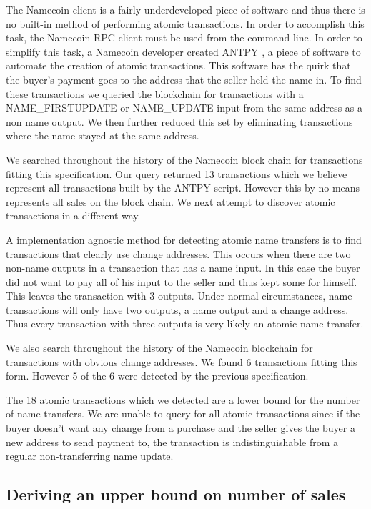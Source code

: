 The Namecoin client is a fairly underdeveloped piece of software and thus there is no built-in method of performing atomic transactions. In order to accomplish this task, the Namecoin RPC client must be used from the command line. In order to simplify this task, a Namecoin developer created ANTPY \cite{antpy}, a piece of software to automate the creation of atomic transactions. This software has the quirk that the buyer's payment goes to the address that the seller held the name in. To find these transactions we queried the blockchain for transactions with a NAME\_FIRSTUPDATE or NAME\_UPDATE input from the same address as a non name output. We then further reduced this set by eliminating transactions where the name stayed at the same address.

We searched throughout the history of the Namecoin block chain for transactions fitting this specification. Our query returned 13 transactions which we believe represent all transactions built by the ANTPY script. However this by no means represents all sales on the block chain. We next attempt to discover atomic transactions in a different way.

A implementation agnostic method for detecting atomic name transfers is to find transactions that clearly use change addresses. This occurs when there are two non-name outputs in a transaction that has a name input. In this case the buyer did not want to pay all of his input to the seller and thus kept some for himself. This leaves the transaction with 3 outputs. Under normal circumstances, name transactions will only have two outputs, a name output and a change address. Thus every transaction with three outputs is very likely an atomic name transfer.

We also search throughout the history of the Namecoin blockchain for transactions with obvious change addresses. We found 6 transactions fitting this form. However 5 of the 6 were detected by the previous specification.

The 18 atomic transactions which we detected are a lower bound for the number of name transfers. We are unable to query for all atomic transactions since if the buyer doesn't want any change from a purchase and the seller gives the buyer a new address to send payment to, the transaction is indistinguishable from a regular non-transferring name update.

\subsection{Deriving an upper bound on number of sales}


